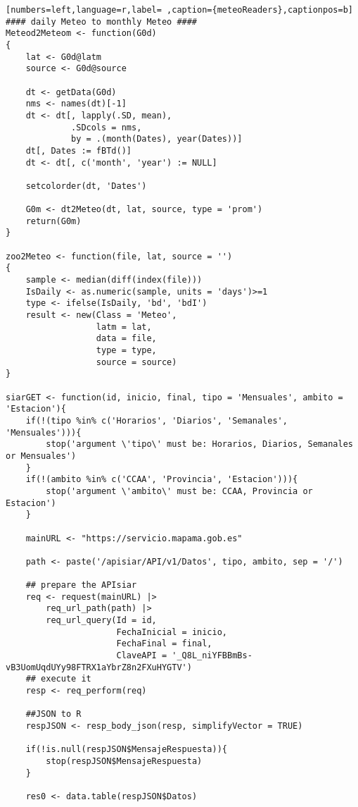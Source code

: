 \begin{lstlisting}[numbers=left,language=r,label= ,caption={meteoReaders},captionpos=b]
#### daily Meteo to monthly Meteo ####
Meteod2Meteom <- function(G0d)
{
    lat <- G0d@latm
    source <- G0d@source

    dt <- getData(G0d)
    nms <- names(dt)[-1]
    dt <- dt[, lapply(.SD, mean),
             .SDcols = nms,
             by = .(month(Dates), year(Dates))]
    dt[, Dates := fBTd()]
    dt <- dt[, c('month', 'year') := NULL]

    setcolorder(dt, 'Dates')

    G0m <- dt2Meteo(dt, lat, source, type = 'prom')
    return(G0m)
}

zoo2Meteo <- function(file, lat, source = '')
{
    sample <- median(diff(index(file)))
    IsDaily <- as.numeric(sample, units = 'days')>=1
    type <- ifelse(IsDaily, 'bd', 'bdI')
    result <- new(Class = 'Meteo',
                  latm = lat,
                  data = file,
                  type = type,
                  source = source)
}

siarGET <- function(id, inicio, final, tipo = 'Mensuales', ambito = 'Estacion'){
    if(!(tipo %in% c('Horarios', 'Diarios', 'Semanales', 'Mensuales'))){
        stop('argument \'tipo\' must be: Horarios, Diarios, Semanales or Mensuales')
    }
    if(!(ambito %in% c('CCAA', 'Provincia', 'Estacion'))){
        stop('argument \'ambito\' must be: CCAA, Provincia or Estacion')
    }

    mainURL <- "https://servicio.mapama.gob.es"

    path <- paste('/apisiar/API/v1/Datos', tipo, ambito, sep = '/')

    ## prepare the APIsiar
    req <- request(mainURL) |>
        req_url_path(path) |>
        req_url_query(Id = id,
                      FechaInicial = inicio,
                      FechaFinal = final,
                      ClaveAPI = '_Q8L_niYFBBmBs-vB3UomUqdUYy98FTRX1aYbrZ8n2FXuHYGTV')
    ## execute it
    resp <- req_perform(req)

    ##JSON to R
    respJSON <- resp_body_json(resp, simplifyVector = TRUE)

    if(!is.null(respJSON$MensajeRespuesta)){
        stop(respJSON$MensajeRespuesta)
    }

    res0 <- data.table(respJSON$Datos)


\end{lstlisting}
